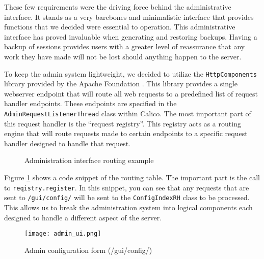 These few requirements were the driving force behind the administrative interface. It stands as a very barebones and minimalistic interface that provides functions that we decided were essential to operation. This administrative interface has proved invaluable when generating and restoring backups. Having a backup of sessions provides users with a greater level of reassurance that any work they have made will not be lost should anything happen to the server.

% 
To keep the admin system lightweight, we decided to utilize the \texttt{HttpComponents} library provided by the Apache Foundation \cite{apache:http}. This library provides a single webserver endpoint that will route all web requests to a predefined list of request handler endpoints. These endpoints are specified in the \texttt{AdminRequestListenerThread} class within Calico. The most important part of this request handler is the ``request registry''. This registry acts as a routing engine that will route requests made to certain endpoints to a specific request handler designed to handle that request.

\begin{figure}[h!]
  \centering
  \small
  
  \normalsize
  \caption{Administration interface routing example}
  \label{code:request_registry}
\end{figure}

Figure \ref{code:request_registry} shows a code snippet of the routing table. The important part is the call to \texttt{reqistry.register}. In this snippet, you can see that any requests that are sent to \texttt{/gui/config/} will be sent to the \texttt{ConfigIndexRH} class to be processed. This allows us to break the administration system into logical components each designed to handle a different aspect of the server. 

\begin{figure}[h!]
  \centering
  \texttt{[image: admin\_ui.png]}
  \caption{Admin configuration form (/gui/config/)}
  \label{fig:admin_config}
\end{figure}

